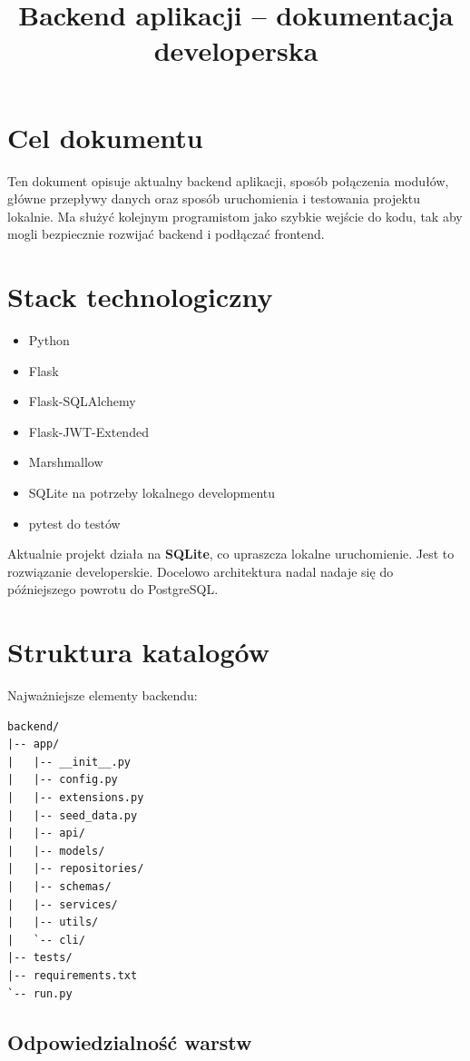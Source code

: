 \documentclass[11pt,a4paper]{article}
\title{Backend aplikacji -- dokumentacja developerska}
\author{}
\date{}
\begin{document}
\maketitle

\section{Cel dokumentu}

Ten dokument opisuje aktualny backend aplikacji, sposób połączenia modułów, główne przepływy danych oraz sposób uruchomienia i testowania projektu lokalnie. Ma służyć kolejnym programistom jako szybkie wejście do kodu, tak aby mogli bezpiecznie rozwijać backend i podłączać frontend.

\section{Stack technologiczny}

\begin{itemize}[leftmargin=1.2cm]
    \item Python
    \item Flask
    \item Flask-SQLAlchemy
    \item Flask-JWT-Extended
    \item Marshmallow
    \item SQLite na potrzeby lokalnego developmentu
    \item pytest do testów
\end{itemize}

Aktualnie projekt działa na \textbf{SQLite}, co upraszcza lokalne uruchomienie. Jest to rozwiązanie developerskie. Docelowo architektura nadal nadaje się do późniejszego powrotu do PostgreSQL.

\section{Struktura katalogów}

Najważniejsze elementy backendu:

\begin{lstlisting}
backend/
|-- app/
|   |-- __init__.py
|   |-- config.py
|   |-- extensions.py
|   |-- seed_data.py
|   |-- api/
|   |-- models/
|   |-- repositories/
|   |-- schemas/
|   |-- services/
|   |-- utils/
|   `-- cli/
|-- tests/
|-- requirements.txt
`-- run.py
\end{lstlisting}

\subsection{Odpowiedzialność warstw}
\end{document}
